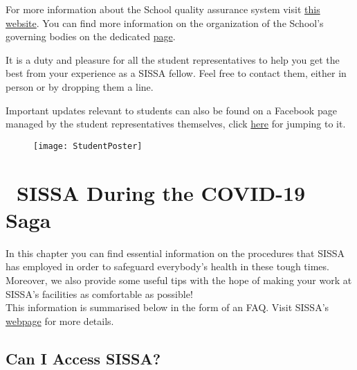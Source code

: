 \documentclass{sissavademecum}
\begin{document}
For more information about the School quality assurance system visit \href{https://www.sissa.it/qualita}{this website}. You can find more information on the organization of the School's governing bodies on the dedicated \href{https://www.sissa.it/general-organization}{page}.

It is a duty and pleasure for all the student representatives to help you get the best from your experience as a SISSA fellow. Feel free to contact them, either in person or by dropping them a line.

Important updates relevant to students can also be found on a Facebook page managed by the student representatives themselves, click \href{https://www.facebook.com/groups/sissastudents/}{here} for jumping to it.

\begin{figure}
	\vspace*{-12pt}
	\texttt{[image: StudentPoster]}
\end{figure}




\chapter{\texorpdfstring{\faShieldVirus\ }{}SISSA During the COVID-19 Saga}

In this chapter you can find essential information on the procedures that SISSA has employed in order to safeguard everybody's health in these tough times. Moreover, we also provide some useful tips with the hope of making your work at SISSA's facilities as comfortable as possible! \\
This information is summarised below in the form of an FAQ. Visit SISSA's \href{https://www.sissa.it/news/covid-19-access-sissa-and-schools-activities}{webpage} for more details.


\section{Can I Access SISSA?}
\end{document}
